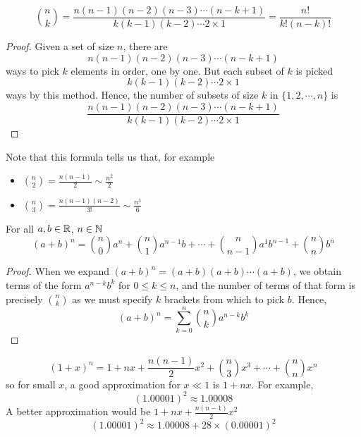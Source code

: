 \documentclass{article}
\begin{document}
\begin{nprop}\label{prop:4-2}
    \[
        \binom{n}{k} = \frac{n(n-1)(n-2)(n-3) \cdots (n - k + 1)}{k (k-1) (k-2) \cdots 2 \times 1} = \frac{n!}{k!(n-k)!}  
    \]
\end{nprop}
\begin{proof}
    Given a set of size $n$, there are
    \[
        n(n-1)(n-2)(n-3) \cdots (n - k + 1)
    \]
    ways to pick $k$ elements in order, one by one.
    But each subset of $k$ is picked
    \[
        k (k-1) (k-2) \cdots 2 \times 1
    \]
    ways by this method.
    Hence, the number of subsets of size $k$ in $\{1, 2, \cdots, n\}$ is
    \[
        \frac{n(n-1)(n-2)(n-3) \cdots (n - k + 1)}{k (k-1) (k-2) \cdots 2 \times 1} 
    \]
\end{proof}
\begin{remark}
    Note that this formula tells us that, for example
    \begin{itemize}
        \item $\binom{n}{2} = \frac{n(n-1)}{2} \sim \frac{n^2}{2}$
        \item $\binom{n}{3} = \frac{n(n-1)(n-2)}{3!} \sim \frac{n^3}{6}$
    \end{itemize}
\end{remark}

\begin{nthm}\label{th:4-3}
    For all $a, b \in \mathbb{R}$, $n \in \mathbb{N}$
    \[
        (a + b)^n = \binom{n}{0} a^n + \binom{n}{1} a^{n-1} b + \cdots + \binom{n}{n-1} a^1b^{n-1} +\binom{n}{n} b^n  
    \]
\end{nthm}
\begin{proof}
    When we expand $(a + b)^n = (a + b)(a + b) \cdots (a + b)$,
    we obtain terms of the form $a^{n - k}b^k$ for $0 \leq k \leq n$,
    and the number of terms of that form is precisely $\binom{n}{k}$ as we must specify $k$ brackets from which to pick $b$.
    Hence, 
    \[
        (a + b)^n = \sum_{k=0}^n \binom{n}{k} a^{n - k}b^k 
    \]
\end{proof}

\begin{eg}
    \[
        (1 + x)^n = 1 + nx + \frac{n(n-1)}{2} x^2 + \binom{n}{3} x^3 + \cdots + \binom{n}{n} x^n  
    \]
    so for small $x$, a good approximation for $x \ll 1$ is $1 + nx$.
    For example,
    \[
        (1.00001)^2 \approx 1.00008  
    \]
    A better approximation would be $1 + nx + \frac{n(n-1)}{2} x^2$
    \[
        (1.00001)^2 \approx 1.00008 + 28 \times(0.00001)^2
    \]
\end{eg}
\end{document}
